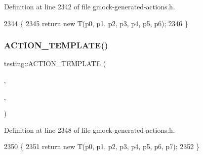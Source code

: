 Definition at line 2342 of file gmock-\/generated-\/actions.\+h.


\begin{DoxyCode}
2344                                                                 \{
2345   \textcolor{keywordflow}{return} \textcolor{keyword}{new} T(p0, p1, p2, p3, p4, p5, p6);
2346 \}
\end{DoxyCode}
\mbox{\label{namespacetesting_a76d58331453ee0a2eb75a5992e35197b}} 
\subsubsection{\texorpdfstring{A\+C\+T\+I\+O\+N\+\_\+\+T\+E\+M\+P\+L\+A\+T\+E()}{ACTION\_TEMPLATE()}\hspace{0.1cm}{\footnotesize\ttfamily [26/28]}}
{\footnotesize\ttfamily testing\+::\+A\+C\+T\+I\+O\+N\+\_\+\+T\+E\+M\+P\+L\+A\+TE (\begin{DoxyParamCaption}\item[{Return\+New}]{,  }\item[{H\+A\+S\+\_\+1\+\_\+\+T\+E\+M\+P\+L\+A\+T\+E\+\_\+\+P\+A\+R\+A\+MS(typename, T)}]{,  }\item[{A\+N\+D\+\_\+8\+\_\+\+V\+A\+L\+U\+E\+\_\+\+P\+A\+R\+A\+MS(p0, p1, p2, p3, p4, p5, p6, p7)}]{ }\end{DoxyParamCaption})}



Definition at line 2348 of file gmock-\/generated-\/actions.\+h.


\begin{DoxyCode}
2350                                                                     \{
2351   \textcolor{keywordflow}{return} \textcolor{keyword}{new} T(p0, p1, p2, p3, p4, p5, p6, p7);
2352 \}
\end{DoxyCode}
\mbox{\label{namespacetesting_adfb5791a941ec1f2a2f8067fd9ac7667}} 
